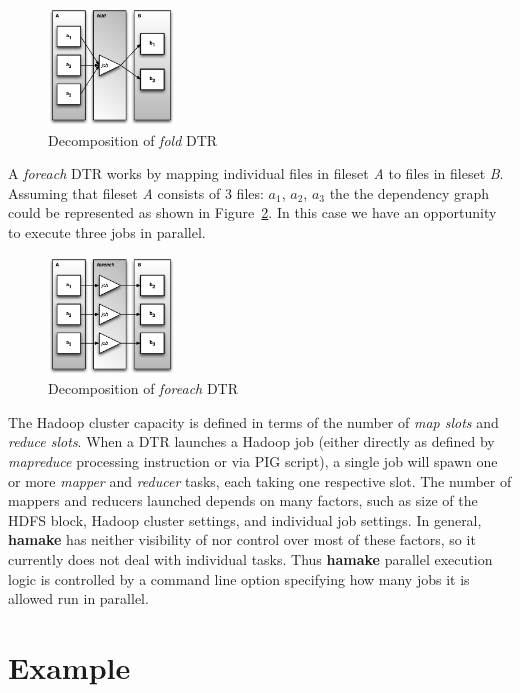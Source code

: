 \documentclass[10pt,conference,letterpaper]{IEEEtran}
\begin{document}
\begin{figure}[htp]
\centering
\includegraphics[width=0.3\textwidth]{twofoldp.eps}
\caption{Decomposition of \emph{fold} DTR}
\label{fig:fold2}
\end{figure}

A \emph{foreach} DTR works by mapping individual files in fileset
\textit{A} to files in fileset \textit{B}. Assuming that fileset
\textit{A} consists of 3 files: \textit{$a_1$}, \textit{$a_2$},
\textit{$a_3$} the the dependency graph could be represented as shown
in Figure~\ref{fig:foreach2}. In this case we have an opportunity to
execute three jobs in parallel.

\begin{figure}[htp]
\centering
\includegraphics[width=0.3\textwidth]{twoforeachp.eps}
\caption{Decomposition of \emph{foreach} DTR}
\label{fig:foreach2}
\end{figure}

The Hadoop cluster capacity is defined in terms of the number of
\textit{map slots} and \textit{reduce slots}. When a DTR launches a
Hadoop job (either directly as defined by \emph{mapreduce} processing
instruction or via PIG script), a single job will spawn one or more
\emph{mapper} and \emph{reducer} tasks, each taking one respective
slot. The number of mappers and reducers launched depends on many
factors, such as size of the HDFS block, Hadoop cluster settings, and
individual job settings. In general, \textbf{hamake} has neither
visibility of nor control over most of these factors, so it currently
does not deal with individual tasks. Thus \textbf{hamake} parallel
execution logic is controlled by a command line option specifying how
many jobs it is allowed run in parallel.

\section{Example}
\end{document}
